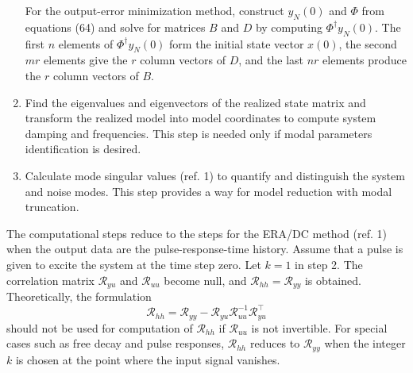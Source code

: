 \begin{enumerate}
  For the output-error minimization method, construct $y_N(0)$ and $\Phi$ from equations (64) and solve for matrices $B$ and $D$ by computing $\Phi^\dagger y_N(0)$. 
  The first $n$ elements of $\Phi^\dagger y_N(0)$ form the initial state vector $x(0)$, the second $mr$ elements give the $r$ column vectors of $D$, and the last $nr$ elements produce the $r$ column vectors of $B$. 
  \item Find the eigenvalues and eigenvectors of the realized state matrix and transform the realized model into model coordinates to compute system damping and frequencies. 
  This step is needed only if modal parameters identification is desired. 
  \item Calculate mode singular values (ref. 1) to quantify and distinguish the system and noise modes. 
  This step provides a way for model reduction with modal truncation. 
\end{enumerate}

The computational steps reduce to the steps for the ERA/DC method (ref. 1) when the output data are the pulse-response-time history. 
Assume that a pulse is given to excite the system at the time step zero. 
Let $k=1$ in step 2. 
The correlation matrix $\mathcal{R}_{yu}$ and $\mathcal{R}_{uu}$ become null, and $\mathcal{R}_{hh}=\mathcal{R}_{yy}$ is obtained. 
Theoretically, the formulation 
\[
  \mathcal{R}_{hh}=\mathcal{R}_{yy}-\mathcal{R}_{yu}\mathcal{R}_{uu}^{-1}\mathcal{R}_{yu}^\top
\]
should not be used for computation of $\mathcal{R}_{hh}$ if $\mathcal{R}_{uu}$ is not invertible. 
For special cases such as free decay and pulse responses, $\mathcal{R}_{hh}$ reduces to $\mathcal{R}_{yy}$ when the integer $k$ is chosen at the point where the input signal vanishes. 